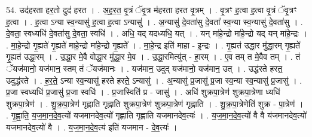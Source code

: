\documentclass[17pt]{extarticle}
\begin{document}
54. उद॑हरता हर॒तो दुद॑ हरत । . अ॒ह॒र॒त॒ वृ॒त्रं ॅवृ॒त्र म॑हरता हरत वृ॒त्रम् । . वृ॒त्रꣳ ह॒त्वा ह॒त्वा वृ॒त्रं ॅवृ॒त्रꣳ ह॒त्वा । . ह॒त्वा ऽन्या स्व॒न्यासु॑ ह॒त्वा ह॒त्वा ऽन्यासु॑ । . अ॒न्यासु॑ दे॒वता॑सु दे॒वता᳚ स्व॒न्या स्व॒न्यासु॑ दे॒वता॑सु । . दे॒वता॒ स्वध्यधि॑ दे॒वता॑सु दे॒वता॒ स्वधि॑ । . अधि॒ यद् यदध्यधि॒ यत् । . यन् मा॑हे॒न्द्रो मा॑हे॒न्द्रो यद् यन् मा॑हे॒न्द्रः । . मा॒हे॒न्द्रो गृ॒ह्यते॑ गृ॒ह्यते॑ माहे॒न्द्रो मा॑हे॒न्द्रो गृ॒ह्यते᳚ । . मा॒हे॒न्द्र इति॑ माहा - इ॒न्द्रः । . गृ॒ह्यत॑ उद्धा॒र मु॑द्धा॒रम् गृ॒ह्यते॑ गृ॒ह्यत॑ उद्धा॒रम् । . उ॒द्धा॒र मे॒वै वोद्धा॒र मु॑द्धा॒र मे॒व । . उ॒द्धा॒रमित्यु॑त् - हा॒रम् । . ए॒व तम् त मे॒वैव तम् । . तं ॅयज॑मानो॒ यज॑मान॒ स्तम् तं ॅयज॑मानः । . यज॑मान॒ उदुद् यज॑मानो॒ यज॑मान॒ उत् । . उद्ध॑रते हरत॒ उदुद्ध॑रते । . ह॒र॒ते॒ ऽन्या स्व॒न्यासु॑ हरते हरते॒ ऽन्यासु॑ । . अ॒न्यासु॑ प्र॒जासु॑ प्र॒जा स्व॒न्या स्व॒न्यासु॑ प्र॒जासु॑ । . प्र॒जा स्वध्यधि॑ प्र॒जासु॑ प्र॒जा स्वधि॑ । . प्र॒जास्विति॑ प्र - जासु॑ । . अधि॑ शुक्रपा॒त्रेण॑ शुक्रपा॒त्रेणा ध्यधि॑ शुक्रपा॒त्रेण॑ । . शु॒क्र॒पा॒त्रेण॑ गृह्णाति गृह्णाति शुक्रपा॒त्रेण॑ शुक्रपा॒त्रेण॑ गृह्णाति । . शु॒क्र॒पा॒त्रेणेति॑ शुक्र - पा॒त्रेण॑ । . गृ॒ह्णा॒ति॒ य॒ज॒मा॒न॒दे॒व॒त्यो॑ यजमानदेव॒त्यो॑ गृह्णाति गृह्णाति यजमानदेव॒त्यः॑ । . य॒ज॒मा॒न॒दे॒व॒त्यो॑ वै वै य॑जमानदेव॒त्यो॑ यजमानदेव॒त्यो॑ वै । . य॒ज॒मा॒न॒दे॒व॒त्य॑ इति॑ यजमान - दे॒व॒त्यः॑ । \newline
\end{document}
